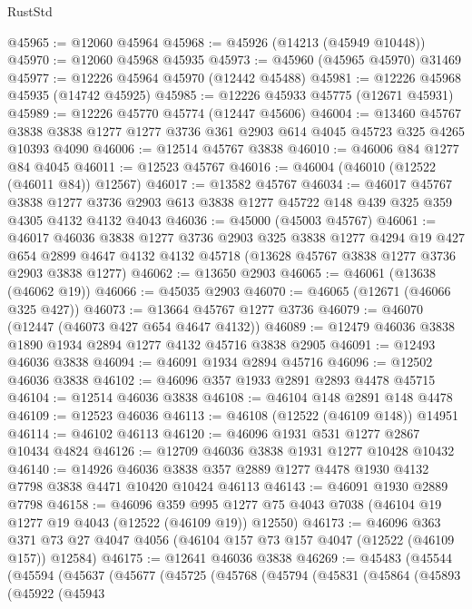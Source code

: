 \begin{lexlean}{RustStd}
\begin{coremodule}
@45965 := @12060 @45964
@45968 := @45926 (@14213 (@45949 @10448))
@45970 := @12060 @45968 @45935
@45973 := @45960 (@45965 @45970) @31469
@45977 := @12226 @45964 @45970 (@12442 @45488)
@45981 := @12226 @45968 @45935 (@14742 @45925)
@45985 := @12226 @45933 @45775 (@12671 @45931)
@45989 := @12226 @45770 @45774 (@12447 @45606)
@46004 := @13460
    @45767
    @3838
    @3838
    @1277
    @1277
    @3736
    @361
    @2903
    @614
    @4045
    @45723
    @325
    @4265
    @10393
    @4090
@46006 := @12514 @45767 @3838
@46010 := @46006 @84 @1277 @84 @4045
@46011 := @12523 @45767
@46016 := @46004 (@46010 (@12522 (@46011 @84)) @12567)
@46017 := @13582 @45767
@46034 := @46017
    @45767
    @3838
    @1277
    @3736
    @2903
    @613
    @3838
    @1277
    @45722
    @148
    @439
    @325
    @359
    @4305
    @4132
    @4132
    @4043
@46036 := @45000 (@45003 @45767)
@46061 := @46017
    @46036
    @3838
    @1277
    @3736
    @2903
    @325
    @3838
    @1277
    @4294
    @19
    @427
    @654
    @2899
    @4647
    @4132
    @4132
    @45718
    (@13628 @45767 @3838 @1277 @3736 @2903 @3838 @1277)
@46062 := @13650 @2903
@46065 := @46061 (@13638 (@46062 @19))
@46066 := @45035 @2903
@46070 := @46065 (@12671 (@46066 @325 @427))
@46073 := @13664 @45767 @1277 @3736
@46079 := @46070 (@12447 (@46073 @427 @654 @4647 @4132))
@46089 := @12479 @46036 @3838 @1890 @1934 @2894 @1277 @4132 @45716 @3838 @2905
@46091 := @12493 @46036 @3838
@46094 := @46091 @1934 @2894 @45716
@46096 := @12502 @46036 @3838
@46102 := @46096 @357 @1933 @2891 @2893 @4478 @45715
@46104 := @12514 @46036 @3838
@46108 := @46104 @148 @2891 @148 @4478
@46109 := @12523 @46036
@46113 := @46108 (@12522 (@46109 @148)) @14951
@46114 := @46102 @46113
@46120 := @46096 @1931 @531 @1277 @2867 @10434 @4824
@46126 := @12709 @46036 @3838 @1931 @1277 @10428 @10432
@46140 := @14926
    @46036
    @3838
    @357
    @2889
    @1277
    @4478
    @1930
    @4132
    @7798
    @3838
    @4471
    @10420
    @10424
    @46113
@46143 := @46091 @1930 @2889 @7798
@46158 := @46096
    @359
    @995
    @1277
    @75
    @4043
    @7038
    (@46104 @19 @1277 @19 @4043 (@12522 (@46109 @19)) @12550)
@46173 := @46096
    @363
    @371
    @73
    @27
    @4047
    @4056
    (@46104 @157 @73 @157 @4047 (@12522 (@46109 @157)) @12584)
@46175 := @12641 @46036 @3838
@46269 := @45483
    (@45544
      (@45594
        (@45637
          (@45677
            (@45725
              (@45768
                (@45794
                  (@45831
                    (@45864
                      (@45893
                        (@45922
                          (@45943

\end{coremodule}
\end{lexlean}
